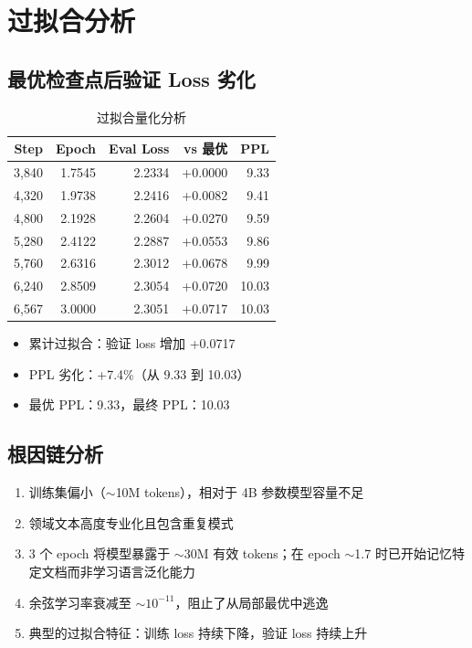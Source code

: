 \documentclass[12pt,a4paper]{ctexart}
\begin{document}
\section{过拟合分析}

\subsection{最优检查点后验证 Loss 劣化}

\begin{table}[htbp]\centering
\caption{过拟合量化分析}
\begin{tabular}{@{}rrrrr@{}}
\toprule
\textbf{Step} & \textbf{Epoch} & \textbf{Eval Loss} & \textbf{vs 最优} & \textbf{PPL} \\
\midrule
3,840 & 1.7545 & 2.2334 & +0.0000 & 9.33 \\
4,320 & 1.9738 & 2.2416 & +0.0082 & 9.41 \\
4,800 & 2.1928 & 2.2604 & +0.0270 & 9.59 \\
5,280 & 2.4122 & 2.2887 & +0.0553 & 9.86 \\
5,760 & 2.6316 & 2.3012 & +0.0678 & 9.99 \\
6,240 & 2.8509 & 2.3054 & +0.0720 & 10.03 \\
6,567 & 3.0000 & 2.3051 & +0.0717 & 10.03 \\
\bottomrule
\end{tabular}
\end{table}

\begin{itemize}[nosep]
    \item 累计过拟合：验证 loss 增加 +0.0717
    \item PPL 劣化：+7.4\%（从 9.33 到 10.03）
    \item 最优 PPL：9.33，最终 PPL：10.03
\end{itemize}

\subsection{根因链分析}

\begin{enumerate}[nosep]
    \item 训练集偏小（$\sim$10M tokens），相对于 4B 参数模型容量不足
    \item 领域文本高度专业化且包含重复模式
    \item 3 个 epoch 将模型暴露于 $\sim$30M 有效 tokens；在 epoch $\sim$1.7 时已开始记忆特定文档而非学习语言泛化能力
    \item 余弦学习率衰减至 $\sim 10^{-11}$，阻止了从局部最优中逃逸
    \item 典型的过拟合特征：训练 loss 持续下降，验证 loss 持续上升
\end{enumerate}
\end{document}
